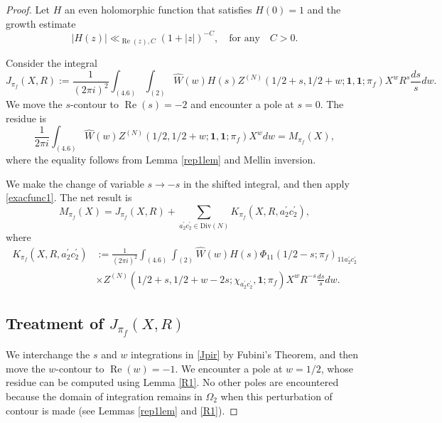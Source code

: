 \documentclass[12pt,reqno]{amsart}
\theoremstyle{plain}
\theoremstyle{remark}
\renewcommand{\Re}{\operatorname{Re}}
\numberwithin{equation}{section}
\numberwithin{lemma}{section}
\numberwithin{theorem}{section}
\numberwithin{prop}{section}
\numberwithin{remark}{section}
\begin{document}
\begin{proof}
Let $H$ an even holomorphic function that satisfies $H(0)=1$ and
the growth estimate 
\begin{equation*}
|H(z)| \ll_{\Re(z),C} (1+|z|)^{-C}, \quad \text{for any} \quad C>0.
\end{equation*}

Consider the integral
\begin{equation} \label{Jpir}
J_{\pi_f}(X,R):=\frac{1}{(2 \pi i)^2} \int_{(4.6)} \int_{(2)} \widehat{W}(w) H(s)
 Z^{(N)} (1/2+s,1/2+w;\mathbf{1},\mathbf{1};\pi_f) X^{w} R^{s} \frac{ds}{s} dw.
\end{equation}
We move the $s$-contour to $\Re(s)=-2$ and encounter a pole at $s=0$. The residue is  
\begin{equation*}
\frac{1}{2 \pi i} \int_{(4.6)} \widehat{W}(w) Z^{(N)}(1/2,1/2+w;\mathbf{1},\mathbf{1};\pi_f) X^{w} dw = M_{\pi_f}(X),
\end{equation*}
where the equality follows from Lemma \ref{rep1lem} and Mellin inversion. 

We make the change of variable 
$s \rightarrow -s$ in the shifted integral, 
and then apply \eqref{exacfunc1}. The net result is 
\begin{equation} \label{mastereqn}
M_{\pi_f}(X)=J_{\pi_f}(X,R) +
\sum_{a_2^{\prime} c_2^{\prime} \in \text{Div}(N)} 
 K_{\pi_f}(X,R,a^{\prime}_2 c^{\prime}_2),
\end{equation}
where 
\begin{align} 
K_{\pi_f}(X,R,a^{\prime}_2 c^{\prime}_2)&:=\frac{1}{(2 \pi i)^2} \int_{(4.6)} \int_{(2)} \widehat{W}(w) H(s) 
 \Phi_{11}(1/2-s;\pi_f)_{11a_2^{\prime} c_2^{\prime}} \nonumber  \\
& \times Z^{(N)} (1/2+s,1/2+w-2s;\chi_{a_2^{\prime} c_2^{\prime}} ,\mathbf{1};\pi_f) X^{w} R^{-s} 
\frac{ds}{s} dw.  \label{Kpiac}
\end{align} 

\subsection{Treatment of $J_{\pi_f}(X,R)$} \label{Jpisec}
We interchange the $s$ and $w$ integrations in \eqref{Jpir} by Fubini's Theorem, 
and then move the $w$-contour to $\Re(w)=-1$. We encounter a pole at $w=1/2$, 
whose residue can be computed using Lemma \ref{R1}. No other poles are encountered
because the domain of integration remains in $\Omega_2$ when this perturbation of contour is made 
(see Lemmas \ref{rep1lem} and \ref{R1}).


\end{proof}
\end{document}
